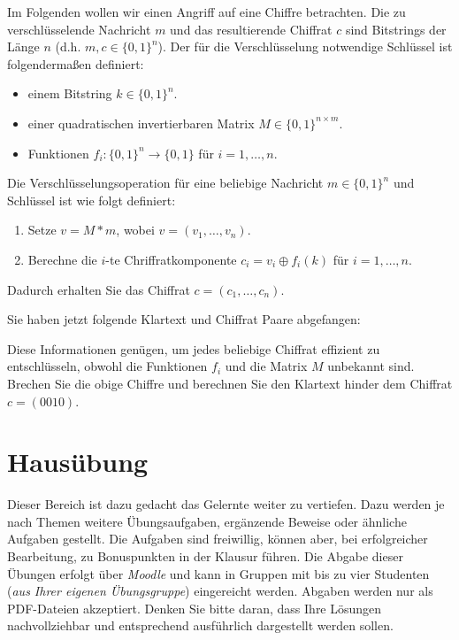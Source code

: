 \documentclass[
  ngerman,
  DIV=12
]{scrartcl}
\begin{document}
Im Folgenden wollen wir einen Angriff auf eine Chiffre betrachten. Die zu verschlüsselende Nachricht $m$ und das resultierende Chiffrat $c$ sind Bitstrings der Länge $n$ (d.h. $m, c \in \{0, 1\}^n$). Der für die Verschlüsselung notwendige Schlüssel ist folgendermaßen definiert:
\begin{itemize}
\item einem Bitstring $k \in \{0, 1\}^n$.
\item einer quadratischen invertierbaren Matrix $M \in \{0, 1\}^{n \times m}$.
\item Funktionen $f_i: \{0, 1\}^n \to \{0, 1\}$ für $i = 1,\dots, n$.
\end{itemize}
Die Verschlüsselungsoperation für eine beliebige Nachricht $m \in \{0, 1\}^n$ und Schlüssel ist wie folgt definiert:
\begin{enumerate}
\item Setze $v = M * m$, wobei $v = (v_1, \dots, v_n)$.
\item Berechne die $i$-te Chriffratkomponente $c_i = v_i \oplus f_i(k)$ für $i = 1, \dots, n$.  
\end{enumerate}
Dadurch erhalten Sie das Chiffrat $c = (c_1, \dots, c_n)$.

Sie haben jetzt folgende Klartext und Chiffrat Paare abgefangen:


Diese Informationen genügen, um jedes beliebige Chiffrat effizient zu entschlüsseln, obwohl die Funktionen $f_i$ und die Matrix $M$ unbekannt sind. Brechen Sie die obige Chiffre und berechnen Sie den Klartext hinder dem Chiffrat $c = (0010)$.


\section{Hausübung}

Dieser Bereich ist dazu gedacht das Gelernte weiter zu vertiefen. Dazu werden je nach Themen weitere Übungsaufgaben, ergänzende Beweise oder ähnliche Aufgaben gestellt. Die Aufgaben sind freiwillig, können aber, bei erfolgreicher Bearbeitung, zu Bonuspunkten in der Klausur führen. Die Abgabe dieser Übungen erfolgt über \emph{Moodle} und kann in Gruppen mit bis zu vier Studenten (\emph{aus Ihrer eigenen Übungsgruppe}) eingereicht werden. Abgaben werden nur als PDF-Dateien akzeptiert. Denken Sie bitte daran, dass Ihre Lösungen nachvollziehbar und entsprechend ausführlich dargestellt werden sollen.
\end{document}

